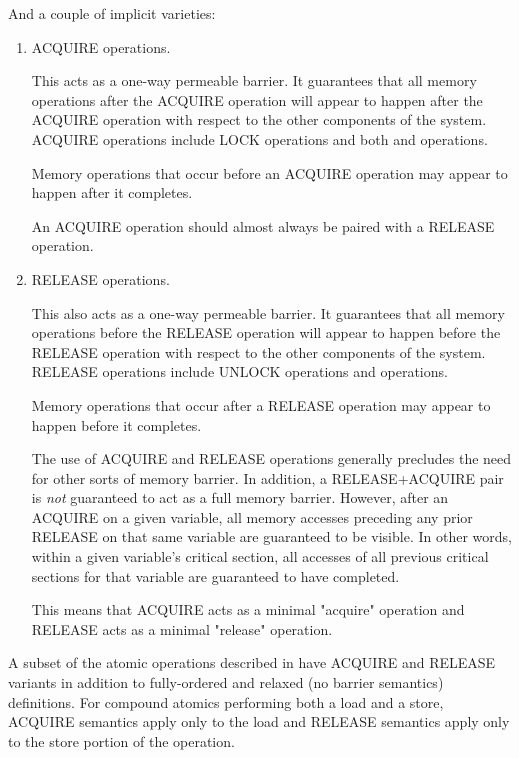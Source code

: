 And a couple of implicit varieties:

\begin{enumerate}
 \item
     ACQUIRE operations.

     This acts as a one-way permeable barrier.
     It guarantees that all memory operations after the ACQUIRE operation
     will appear to happen after the ACQUIRE operation with respect to the
     other components of the system.
     ACQUIRE operations include LOCK operations and both 
     and  operations.

     Memory operations that occur before an ACQUIRE operation may appear to
     happen after it completes.

     An ACQUIRE operation should almost always be paired with a RELEASE
     operation.


 \item
     RELEASE operations.

     This also acts as a one-way permeable barrier.
     It guarantees that all memory operations before the RELEASE operation
     will appear to happen before the RELEASE operation with respect to
     the other components of the system.
     RELEASE operations include UNLOCK operations and 
     operations.

     Memory operations that occur after a RELEASE operation may appear to
     happen before it completes.

     The use of ACQUIRE and RELEASE operations generally precludes the need
     for other sorts of memory barrier.
     In addition, a RELEASE+ACQUIRE pair is \emph{not} guaranteed to act
     as a full memory barrier.
     However, after an ACQUIRE on a given variable, all memory accesses
     preceding any prior RELEASE on that same variable are guaranteed to
     be visible.
     In other words, within a given variable's critical section, all
     accesses of all previous critical sections for that variable are
     guaranteed to have completed.

     This means that ACQUIRE acts as a minimal "acquire" operation and
     RELEASE acts as a minimal "release" operation.
\end{enumerate}

A subset of the atomic operations described in  have
ACQUIRE and RELEASE variants in addition to fully-ordered and relaxed
(no barrier semantics) definitions.
For compound atomics performing both a load and a store, ACQUIRE semantics
apply only to the load and RELEASE semantics apply only to the store portion
of the operation.

